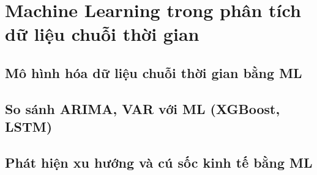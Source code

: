 \chapter{Machine Learning trong phân tích dữ liệu chuỗi thời gian}
\section{Mô hình hóa dữ liệu chuỗi thời gian bằng ML}
\section{So sánh ARIMA, VAR với ML (XGBoost, LSTM)}
\section{Phát hiện xu hướng và cú sốc kinh tế bằng ML}